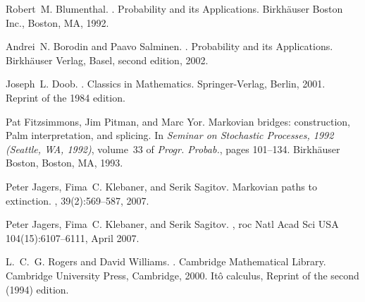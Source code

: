 \documentclass[reqno,10pt]{amsart}
\theoremstyle{definition}
\theoremstyle{remark}
\numberwithin{equation}{section}
\begin{document}
\begin{thebibliography}{1}

Robert~M. Blumenthal.
.
\newblock Probability and its Applications. Birkh\"auser Boston Inc., Boston,
  MA, 1992.

Andrei~N. Borodin and Paavo Salminen.
.
\newblock Probability and its Applications. Birkh\"auser Verlag, Basel, second
  edition, 2002.

Joseph~L. Doob.
.
\newblock Classics in Mathematics. Springer-Verlag, Berlin, 2001.
\newblock Reprint of the 1984 edition.

Pat Fitzsimmons, Jim Pitman, and Marc Yor.
\newblock Markovian bridges: construction, {P}alm interpretation, and splicing.
\newblock In {\em Seminar on {S}tochastic {P}rocesses, 1992 ({S}eattle, {WA},
  1992)}, volume~33 of {\em Progr. Probab.}, pages 101--134. Birkh\"auser
  Boston, Boston, MA, 1993.

Peter Jagers, Fima~C. Klebaner, and Serik Sagitov.
\newblock Markovian paths to extinction.
, 39(2):569--587, 2007.

Peter Jagers, Fima~C. Klebaner, and Serik Sagitov.
,
roc {N}atl {A}cad {S}ci {USA}
104(15):6107--6111, April 2007.

L.~C.~G. Rogers and David Williams.
.
\newblock Cambridge Mathematical Library. Cambridge University Press,
  Cambridge, 2000.
\newblock It{\^o} calculus, Reprint of the second (1994) edition.

\end{thebibliography}
\end{document}
